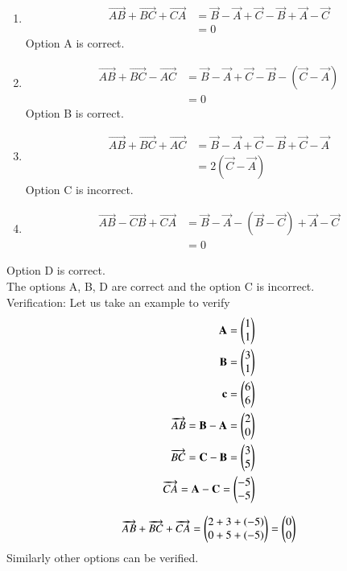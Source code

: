 \documentclass[journal,12pt,twocolumn]{IEEEtran}
\begin{document}
\begin{enumerate}
\begin{enumerate}
\item 
\begin{align}
\overrightarrow{AB}+\overrightarrow{BC}+\overrightarrow{CA} &=
\vec{B}-\vec{A} + \vec{C} - \vec{B} + \vec{A} - \vec{C}\\
 &= 0
\end{align}
Option A is correct.\\

\item
\begin{align}
\overrightarrow{AB}+\overrightarrow{BC}-\overrightarrow{AC} &=
\vec{B}-\vec{A} + \vec{C} - \vec{B} - (\vec{C} - \vec{A})\\
 &= 0
\end{align}
Option B is correct.\\

\item 
\begin{align}
\overrightarrow{AB}+\overrightarrow{BC}+\overrightarrow{AC} &=
\vec{B}-\vec{A} + \vec{C} - \vec{B} + \vec{C} - \vec{A}\\
 &= 2(\vec{C}-\vec{A})
\end{align}
Option C is incorrect.\\

\item
\begin{align}
\overrightarrow{AB}-\overrightarrow{CB}+\overrightarrow{CA} &=
\vec{B}-\vec{A} - (\vec{B} - \vec{C}) + \vec{A} - \vec{C}\\
 &= 0
\end{align}
\end{enumerate}
Option D is correct.\\

The options A, B, D are correct and the option C is incorrect.\\

Verification: Let us take an example to verify 
\begin{align}
\mathbf{A} = \begin{pmatrix}1\\1\end{pmatrix} \\
\mathbf{B} = \begin{pmatrix}3\\1\end{pmatrix} \\
\mathbf{c} = \begin{pmatrix}6\\6\end{pmatrix} \\
\overrightarrow{AB} = \mathbf{B} - \mathbf{A} = \begin{pmatrix}2\\0\end{pmatrix} \\
\overrightarrow{BC} = \mathbf{C} - \mathbf{B} = \begin{pmatrix}3\\5\end{pmatrix} \\
\overrightarrow{CA} = \mathbf{A} - \mathbf{C} = \begin{pmatrix}-5\\-5\end{pmatrix} 
\end{align}

\begin{align}
\overrightarrow{AB}+\overrightarrow{BC}+\overrightarrow{CA} = \begin{pmatrix}2+3+(-5) \\ 0+5+(-5)\end{pmatrix} = \begin{pmatrix}0 \\0\end{pmatrix}
\end{align}
Similarly other options can be verified.

\end{enumerate}
\end{document}
